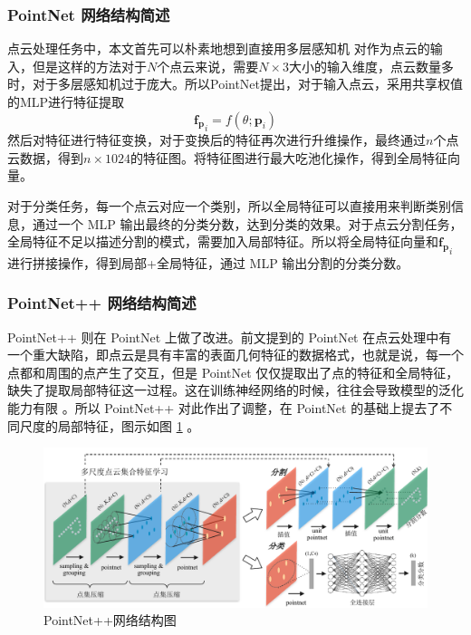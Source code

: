 \subsubsection{PointNet 网络结构简述}
点云处理任务中，本文首先可以朴素地想到直接用多层感知机\cite{lecun2015deep} 对作为点云的输入，但是这样的方法对于$N$个点云来说，需要$N \times 3$大小的输入维度，点云数量多时，对于多层感知机过于庞大。所以PointNet提出，对于输入点云，采用共享权值的MLP进行特征提取
\begin{equation}
    \boldsymbol{f_p}_i = f(\theta; \boldsymbol{p}_i)
\end{equation}
然后对特征进行特征变换，对于变换后的特征再次进行升维操作，最终通过$n$个点云数据，得到$n \times 1024$的特征图。将特征图进行最大吃池化操作，得到全局特征向量。

对于分类任务，每一个点云对应一个类别，所以全局特征可以直接用来判断类别信息，通过一个 MLP 输出最终的分类分数，达到分类的效果。对于点云分割任务，全局特征不足以描述分割的模式，需要加入局部特征。所以将全局特征向量和$\boldsymbol{f_p}_i$进行拼接操作，得到局部+全局特征，通过 MLP 输出分割的分类分数。

\subsubsection{PointNet++ 网络结构简述}
PointNet++\cite{qi2017pointnet++} 则在 PointNet 上做了改进。前文提到的 PointNet 在点云处理中有一个重大缺陷，即点云是具有丰富的表面几何特征的数据格式，也就是说，每一个点都和周围的点产生了交互，但是 PointNet 仅仅提取出了点的特征和全局特征，缺失了提取局部特征这一过程。这在训练神经网络的时候，往往会导致模型的泛化能力有限\cite{qi2017pointnet++} 。所以 PointNet++ 对此作出了调整，在 PointNet 的基础上提去了不同尺度的局部特征，图示如图 \ref{fig:pointnet++} 。

\begin{figure}
    \centering
    \includegraphics[width=\linewidth]{images/pointnet++.pdf}
    \caption{PointNet++\cite{qi2017pointnet++}网络结构图}
    \label{fig:pointnet++}
    \vspace{-5mm}
\end{figure}

